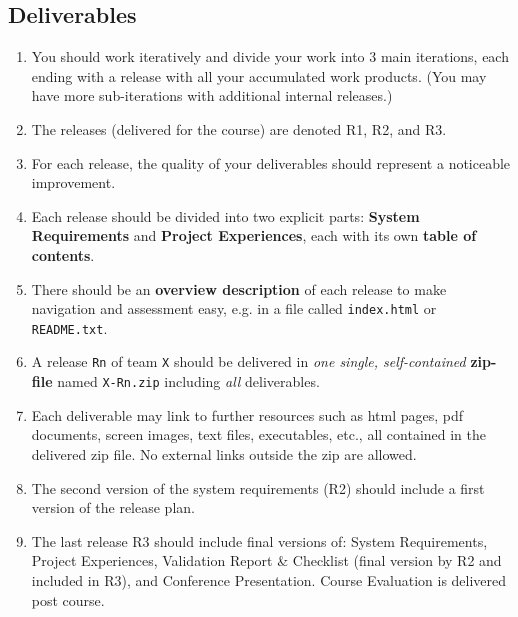 \documentclass{project}
\begin{document}
\subsection{Deliverables}
  \begin{enumerate}[nolistsep]
    \item You should work iteratively and divide your work into 3 main iterations, each ending with a release with all your accumulated work products. (You may have more sub-iterations with additional internal releases.)
    \item The releases (delivered for the course) are denoted R1, R2, and R3.
    \item For each release, the quality of your deliverables should represent a noticeable improvement.
    \item Each release should be divided into two explicit parts: {\bf System Requirements} and {\bf Project Experiences}, each with its own {\bf table of contents}.
    \item There should be an {\bf overview description} of each release to make navigation and assessment easy, e.g. in a file called \verb+index.html+ or \verb+README.txt+.
    \item A release \verb+Rn+ of team \verb+X+ should be delivered in {\it one single, self-contained} {\bf zip-file} named \verb+X-Rn.zip+ including {\it all} deliverables.
    \item Each deliverable may link to further resources such as html pages, pdf documents, screen images, text files, executables, etc., all contained in the delivered zip file. No external links outside the zip are allowed.
    \item The second version of the system requirements (R2) should include a first version of the release plan.
    \item The last release R3 should include final versions of: System Requirements, Project Experiences, Validation Report \& Checklist (final version by R2 and included in R3), and Conference Presentation. Course Evaluation is delivered post course.


\end{enumerate}
\end{document}
